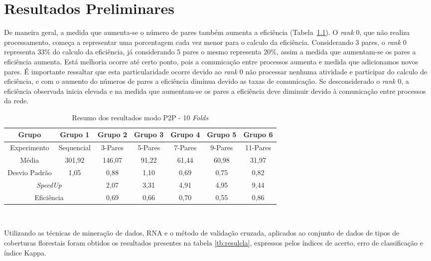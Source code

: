 \chapter{Resultados Preliminares}

De maneira geral, a medida que aumenta-se o número de pares também aumenta a eficiência (Tabela~\ref{tab:p2p}). O \textit{rank} 0, que não realiza processamento, começa a representar uma porcentagem cada vez menor para o calculo da eficiência. Considerando 3 pares, o \textit{rank} 0 representa 33\% do calculo da eficiência, já considerando 5 pares o mesmo representa 20\%, assim a medida que aumentam-se os pares a eficiência aumenta. Está melhoria ocorre até certo ponto, pois a comunicação entre processos aumenta e medida que adicionamos novos pares. É importante ressaltar que esta particularidade ocorre devido ao \textit{rank} 0 não processar nenhuma atividade e participar do calculo de eficiência, e com o aumento do números de pares a eficiência diminua devido as taxas de comunicação. Se desconsiderado o \textit{rank} 0, a eficiência observada inicia elevada e na medida que aumentam-se os pares a eficiência deve diminuir devido à comunicação entre processos da rede.

\begin{table}[!h]
\caption{ Resumo dos resultados modo P2P - 10 \textit{Folds} }
\label{tab:p2p}
\centering
\setlength{\tabcolsep}{5pt}
\begin{tabular}{ccccccc}
\hline
Grupo &Grupo 1 &Grupo 2 &Grupo 3 &Grupo 4 &Grupo 5 &Grupo 6 \\
\hline
Experimento &Sequencial &3-Pares &5-Pares &7-Pares &9-Pares &11-Pares \\
\hline
Média &301,92 &146,07 &91,22 &61,44 &60,98 &31,97 \\
\hline
Desvio Padrão &1,05 &0,88 &1,10 &0,69 &0,75 &0,82 \\
\hline
\multicolumn{2}{c}{\textit{SpeedUp}} &2,07 &3,31 &4,91 &4,95 &9,44 \\
\hline
\multicolumn{2}{c}{Eficiência} &0,69 &0,66 &0,70 &0,55 &0,86 \\
\hline
\end{tabular}
\\
\singlespacing
{}
\end{table}

Utilizando as técnicas de mineração de dados, RNA e o método de validação cruzada, aplicados ao conjunto de dados de tipos de coberturas florestais foram obtidos os resultados presentes na tabela \ref{tb:resulcla}, expressos pelos índices de acerto, erro de classificação e índice Kappa.

